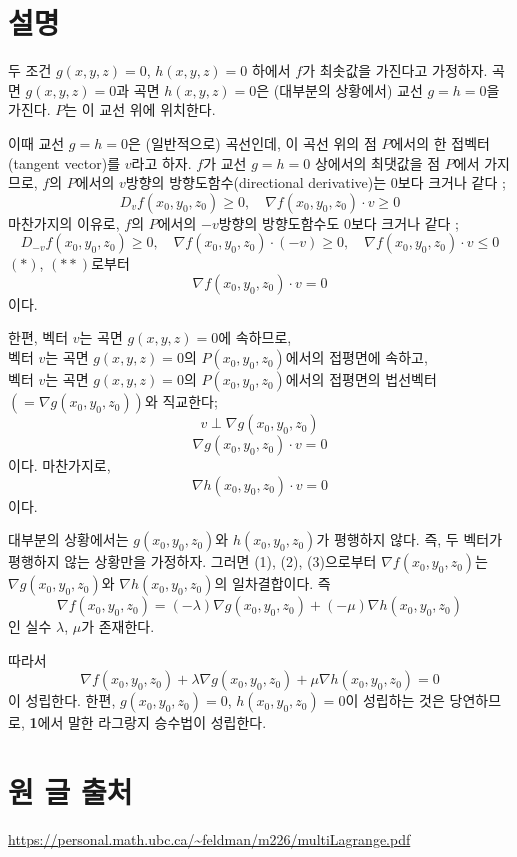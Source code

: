 \documentclass{article}
\begin{document}
\section{설명}
두 조건 $g(x,y,z)=0$, $h(x,y,z)=0$ 하에서 $f$가 최솟값을 가진다고 가정하자.
곡면 $g(x,y,z)=0$과 곡면 $h(x,y,z)=0$은 (대부분의 상황에서) 교선 $g=h=0$을 가진다.
$P$는 이 교선 위에 위치한다.

이때 교선 $g=h=0$은 (일반적으로) 곡선인데, 이 곡선 위의 점 $P$에서의 한 접벡터(tangent vector)를 $v$라고 하자.
$f$가 교선 $g=h=0$ 상에서의 최댓값을 점 $P$에서 가지므로, $f$의 $P$에서의 $v$방향의 방향도함수(directional derivative)는 0보다 크거나 같다 ; 
\[
D_vf(x_0,y_0,z_0)\ge0,\quad \nabla f(x_0,y_0,z_0)\cdot v\ge0\tag{$*$}
\]
마찬가지의 이유로, $f$의 $P$에서의 $-v$방향의 방향도함수도 0보다 크거나 같다 ; 
\[
D_{-v}f(x_0,y_0,z_0)\ge0,\quad\nabla f(x_0,y_0,z_0)\cdot(-v)\ge0,\quad
\nabla f(x_0,y_0,z_0)\cdot v\le0\tag{$**$}
\]
$(*)$, $(**)$로부터
\[
\nabla f(x_0,y_0,z_0)\cdot v=0\tag{$1$}
\]
이다.

한편, 벡터 $v$는 곡면 $g(x,y,z)=0$에 속하므로,\\
벡터 $v$는 곡면 $g(x,y,z)=0$의 $P(x_0,y_0,z_0)$에서의 접평면에 속하고,\\
벡터 $v$는 곡면 $g(x,y,z)=0$의 $P(x_0,y_0,z_0)$에서의 접평면의 법선벡터$\left(=\nabla g(x_0,y_0,z_0)\right)$와 직교한다;
$$v\perp \nabla g(x_0,y_0,z_0)$$
\[\nabla g(x_0,y_0,z_0)\cdot v = 0\tag{2}\]
이다.
마찬가지로,
\[\nabla h(x_0,y_0,z_0)\cdot v = 0\tag{3}\]
이다.

대부분의 상황에서는 $g(x_0,y_0,z_0)$와 $h(x_0,y_0,z_0)$가 평행하지 않다.
즉, 두 벡터가 평행하지 않는 상황만을 가정하자.
그러면 (1), (2), (3)으로부터 $\nabla f(x_0,y_0,z_0)$는 $\nabla g(x_0,y_0,z_0)$와 $\nabla h(x_0,y_0,z_0)$의 일차결합이다.
즉
$$\nabla f(x_0,y_0,z_0)=(-\lambda)\nabla g(x_0,y_0,z_0)+(-\mu)\nabla h(x_0,y_0,z_0)$$
인 실수 $\lambda$, $\mu$가 존재한다.

따라서
$$\nabla f(x_0,y_0,z_0)+\lambda\nabla g(x_0,y_0,z_0)+\mu\nabla h(x_0,y_0,z_0)=0$$
이 성립한다.
한편, $g(x_0,y_0,z_0)=0$, $h(x_0,y_0,z_0)=0$이 성립하는 것은 당연하므로, \textbf{1}에서 말한 라그랑지 승수법이 성립한다.


\section*{원 글 출처}
\url{https://personal.math.ubc.ca/~feldman/m226/multiLagrange.pdf}
\end{document}

